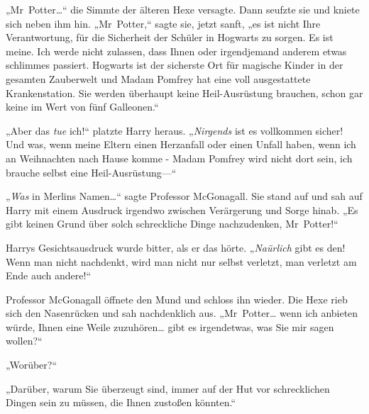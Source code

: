 {„Mr~Potter…“ die Simmte der älteren Hexe versagte. Dann seufzte sie und kniete sich neben ihm hin. „Mr~Potter,“ sagte sie, jetzt sanft, „es ist nicht Ihre Verantwortung, für die Sicherheit der Schüler in Hogwarts zu sorgen. Es ist meine. Ich werde nicht zulassen, dass Ihnen oder irgendjemand anderem etwas schlimmes passiert. Hogwarts ist der sicherste Ort für magische Kinder in der gesamten Zauberwelt und Madam Pomfrey hat eine voll ausgestattete Krankenstation. Sie werden überhaupt keine Heil-Ausrüstung brauchen, schon gar keine im Wert von fünf Galleonen.“

„Aber das \emph{tue} ich!“ platzte Harry heraus. „\emph{Nirgends} ist es vollkommen sicher! Und was, wenn meine Eltern einen Herzanfall oder einen Unfall haben, wenn ich an Weihnachten nach Hause komme - Madam Pomfrey wird nicht dort sein, ich brauche selbst eine Heil-Ausrüstung—“

„\emph{Was} in Merlins Namen…“ sagte Professor McGonagall. Sie stand auf und sah auf Harry mit einem Ausdruck irgendwo zwischen Verärgerung und Sorge hinab. „Es gibt keinen Grund über solch schreckliche Dinge nachzudenken, Mr~Potter!“

Harrys Gesichtsausdruck wurde bitter, als er das hörte. „\emph{Naürlich} gibt es den! Wenn man nicht nachdenkt, wird man nicht nur selbst verletzt, man verletzt am Ende auch andere!“

Professor McGonagall öffnete den Mund und schloss ihn wieder. Die Hexe rieb sich den Nasenrücken und sah nachdenklich aus. „Mr~Potter… wenn ich anbieten würde, Ihnen eine Weile zuzuhören… gibt es irgendetwas, was Sie mir sagen wollen?“

„Worüber?“

„Darüber, warum Sie überzeugt sind, immer auf der Hut vor schrecklichen Dingen sein zu müssen, die Ihnen zustoßen könnten.“

}
